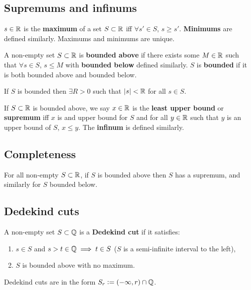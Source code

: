 \subsection{Supremums and infinums}
\begin{definition}
    $s\in\mathbb{R}$ is the \textbf{maximum} of a set $S\subset\mathbb{R}$ iff $\forall s'\in S$, $s\geq s'$. \textbf{Minimums} are defined similarly. Maximums and minimums are unique.
\end{definition}

\begin{definition}[Bounded]
    A non-empty set $S\subset\mathbb{R}$ is \textbf{bounded above} if there exists some $M\in\mathbb{R}$ such that $\forall s\in S$, $s\leq M$ with \textbf{bounded below} defined similarly. $S$ is \textbf{bounded} if it is both bounded above and bounded below.
\end{definition}

\begin{theorem}
    If $S$ is bounded then $\exists R>0$ such that $|s|<\mathbb{R}$ for all $s\in S$.
\end{theorem}

\begin{definition}
    If $S\subset\mathbb{R}$ is bounded above, we say $x\in\mathbb{R}$ is the \textbf{least upper bound} or \textbf{supremum} iff $x$ is and upper bound for $S$ and for all $y\in\mathbb{R}$ such that $y$ is an upper bound of $S$, $x\leq y$. The \textbf{infinum} is defined similarly.
\end{definition}

\subsection{Completeness}

\begin{theorem}
    For all non-empty $S\subset\mathbb{R}$, if $S$ is bounded above then $S$ has a supremum, and similarly for $S$ bounded below.
\end{theorem}

\subsection{Dedekind cuts}

\begin{definition}
    A non-empty set $S\subset\mathbb{Q}$ is a \textbf{Dedekind cut} if it satisfies: \begin{enumerate}
        \item $s\in S$ and $s>t\in\mathbb{Q} \implies t\in S$ ($S$ is a semi-infinite interval to the left),
        \item $S$ is bounded above with no maximum.
    \end{enumerate} Dedekind cuts are in the form $S_r:=(-\infty,r)\cap\mathbb{Q}$.
\end{definition}

